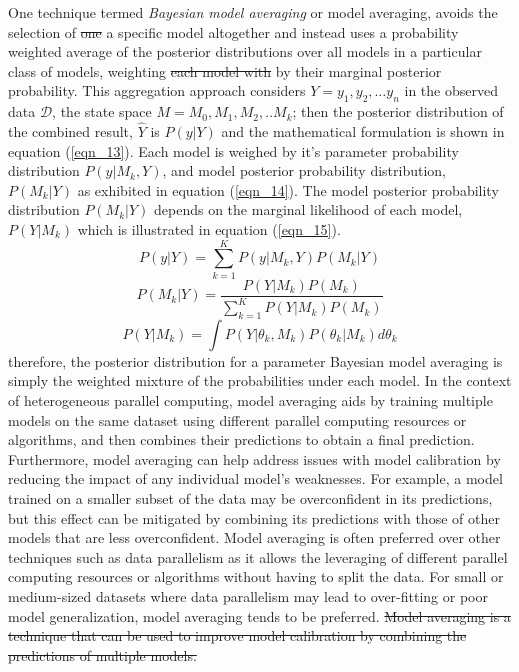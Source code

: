 \documentclass[10pt]{article}[draft]
\begin{document}
One technique termed  \emph{Bayesian model averaging} or model averaging, avoids the selection of \st{one} a specific model altogether and instead uses a probability weighted average of the posterior distributions over all models in a particular class of models, weighting \st{each model with} by their marginal posterior probability. This aggregation approach considers  $Y = y_1, y_2, … y_n$ in the observed data $\mathcal{D}$, the state space $M  = M_0, M_1, M_2, ..M_k$; then the posterior distribution of the combined result, $\hat{Y}$  is $P(y | Y)$ and the mathematical formulation is shown in equation (\ref{eqn_13}). Each model is weighed by it’s parameter probability distribution $P(y | M_k, Y)$, and model posterior probability distribution, $P(M_k | Y )$ as exhibited in equation (\ref{eqn_14}). The model posterior probability distribution $P(M_k | Y )$ depends on the marginal likelihood of each model, $P(Y |M_k)$ which is illustrated in equation (\ref{eqn_15}).
\begin{equation}
P(y | Y) = \sum_{k=1}^K P(y | M_k, Y) P(M_k|Y)
\label{eqn_13}
\end{equation}
\begin{equation}
P(M_k | Y) = \dfrac{P(Y | M_k) P(M_k)}{ \sum_{k=1}^K P(Y | M_k) P(M_k)}
\label{eqn_14}
\end{equation}
\begin{equation}
P(Y |M_k) = \int P(Y|\theta_k , M_k)  P(\theta_k | M_k) d \theta_k
\label{eqn_15}
\end{equation}
therefore, the posterior distribution for a parameter Bayesian model averaging is simply the weighted mixture of the probabilities under each model. In the context of heterogeneous parallel computing, model averaging aids by training multiple models on the same dataset using different parallel computing resources or algorithms, and then combines their predictions to obtain a final prediction. Furthermore, model averaging can help address issues with model calibration by reducing the impact of any individual model's weaknesses. For example, a model trained on a smaller subset of the data may be overconfident in its predictions, but this effect can be mitigated by combining its predictions with those of other models that are less overconfident. Model averaging is often preferred over other techniques such as data parallelism as  it allows the leveraging of different parallel computing resources or algorithms without having to split the data. For small or medium-sized datasets where data parallelism may lead to over-fitting or poor model generalization, model averaging tends to be preferred. \st{Model averaging is a technique that can be used to improve model calibration by combining the predictions of multiple models. }
\end{document}
